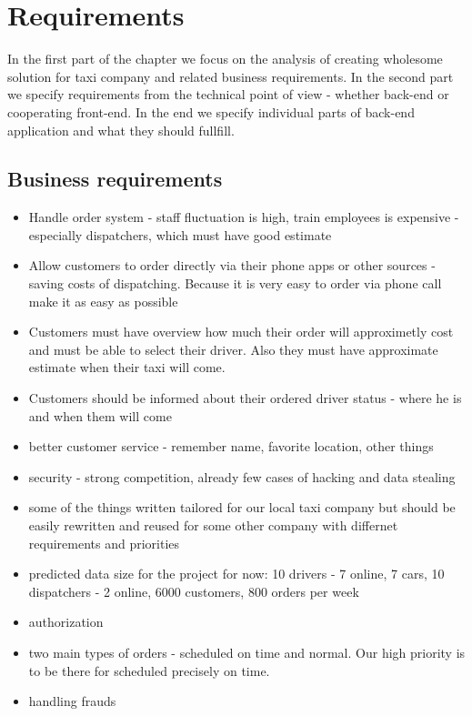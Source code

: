 \chapter{Requirements}
In the first part of the chapter we focus on the analysis of creating wholesome solution for taxi company and related business requirements. In the second part we specify requirements from the technical point of view - whether back-end or cooperating front-end. In the end we specify individual parts of back-end application and what they should fullfill.
\section{Business requirements  } 
\begin{itemize}
	\item Handle order system - staff fluctuation is high, train employees is expensive - especially dispatchers, which must have good estimate
	\item Allow customers to order directly via their phone apps or other sources - saving costs of dispatching. Because it is very easy to order via phone call make it as easy as possible
	\item Customers must have overview how much their order will approximetly cost and must be able to select their driver. Also they must have approximate estimate when their taxi will come.
	\item Customers should be informed about their ordered driver status - where he is and when them will come
	\item better customer service - remember name, favorite location, other things
	\item security - strong competition, already few cases of hacking and data stealing
	\item some of the things written tailored for our local taxi company but should be easily rewritten and reused for some other company with differnet requirements and priorities
	\item predicted data size for the project for now: 10 drivers - 7 online, 7 cars, 10 dispatchers - 2 online, 6000 customers, 800 orders per week
	\item authorization
	\item two main types of orders - scheduled on time and normal. Our high priority is to be there for scheduled precisely on time.
	\item handling frauds
\end{itemize}
